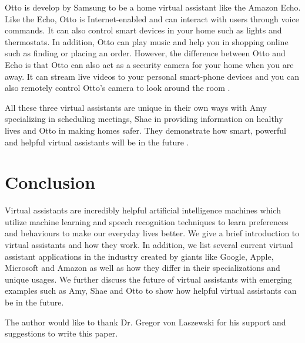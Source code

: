 Otto is develop by Samsung to be a home virtual assistant like the Amazon Echo. Like the Echo, Otto is Internet-enabled and can interact with users through voice commands. It can also control smart devices in your home such as lights and thermostats. In addition, Otto can play music and help you in shopping online such as finding or placing an order. However, the difference between Otto and Echo is that Otto can also act as a security camera for your home when you are away. It can stream live videos to your personal smart-phone devices and you can also remotely control Otto's camera to look around the room \cite{Elgan2016future}.

All these three virtual assistants are unique in their own ways with Amy specializing in scheduling meetings, Shae in providing information on healthy lives and Otto in making homes safer. They demonstrate how smart, powerful and helpful virtual assistants will be in the future \cite{Elgan2016future}.

\section{Conclusion}

    Virtual assistants are incredibly helpful artificial intelligence machines which 
    utilize machine learning and speech recognition techniques to learn preferences 
    and behaviours to make our everyday lives better. We give a brief introduction 
    to virtual assistants and how they work. In addition, we list several current 
    virtual assistant applications in the industry created by giants like Google, 
    Apple, Microsoft and Amazon as well as how they differ in their specializations 
    and unique usages. We further discuss the future of virtual assistants with 
    emerging examples such as Amy, Shae and Otto to show how helpful virtual assistants 
    can be in the future.

\begin{acks}

  The author would like to thank Dr. Gregor von Laszewski for his
  support and suggestions to write this paper.

\end{acks}


 